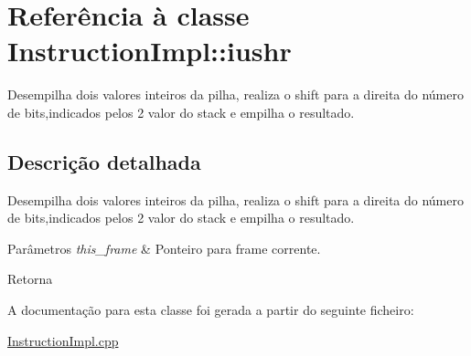 \hypertarget{class_instruction_impl_1_1iushr}{}\section{Referência à classe Instruction\+Impl\+:\+:iushr}
\label{class_instruction_impl_1_1iushr}


Desempilha dois valores inteiros da pilha, realiza o shift para a direita do número de bits,indicados pelos 2 valor do stack e empilha o resultado.  




\subsection{Descrição detalhada}
Desempilha dois valores inteiros da pilha, realiza o shift para a direita do número de bits,indicados pelos 2 valor do stack e empilha o resultado. 


\begin{DoxyParams}{Parâmetros}
{\em this\+\_\+frame} & Ponteiro para frame corrente. \\
\hline
\end{DoxyParams}
\begin{DoxyReturn}{Retorna}

\end{DoxyReturn}


A documentação para esta classe foi gerada a partir do seguinte ficheiro\+:\begin{DoxyCompactItemize}
\item 
\hyperlink{_instruction_impl_8cpp}{Instruction\+Impl.\+cpp}\end{DoxyCompactItemize}
